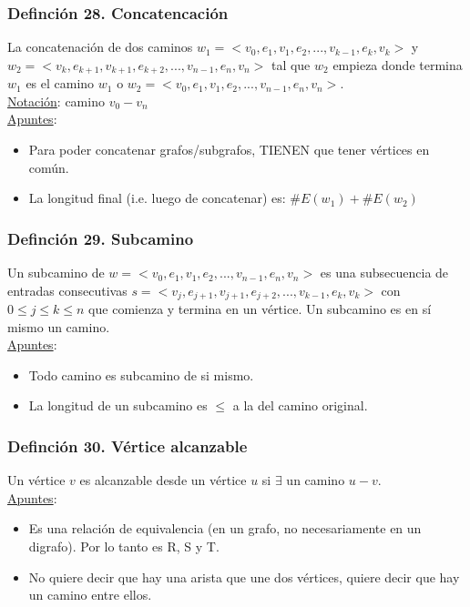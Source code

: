 \documentclass{article}
\begin{document}
\subsubsection*{Definción 28. Concatencación}
La concatenación de dos caminos $w_1 =< v_0,e_1,v_1,e_2,...,v_{k-1},e_k,v_k>$ y $w_2 =< v_k,e_{k+1},v_{k+1},e_{k+2},...,v_{n-1},e_n,v_n>$ tal que $w_2$ empieza donde termina $w_1$ es el camino $w_1$ o $w_2 = < v_0,e_1,v_1,e_2,...,v_{n-1},e_n,v_n>$.
\\\underline{Notación}: camino $v_0 - v_n$
\\\underline{Apuntes}:
\begin{itemize}
    \item Para poder concatenar grafos/subgrafos, TIENEN que tener vértices en común.
    \item La longitud final (i.e. luego de concatenar) es: $\#E(w_1) + \#E(w_2)$
\end{itemize}

\subsubsection*{Definción 29. Subcamino}
Un subcamino de $w =< v_0,e_1,v_1,e_2,...,v_{n-1},e_n,v_n>$ es una subsecuencia de entradas consecutivas $s =< v_j,e_{j+1},v_{j+1},e_{j+2},...,v_{k-1},e_k,v_k>$ con $0 \leq j \leq k \leq n$ que comienza y termina en un vértice.
Un subcamino es en sí mismo un camino.
\\\underline{Apuntes}:
\begin{itemize}
    \item Todo camino es subcamino de si mismo.
    \item La longitud de un subcamino es $\leq$ a la del camino original.
\end{itemize}

\subsubsection*{Definción 30. Vértice alcanzable}
Un vértice $v$ es alcanzable desde un vértice $u$ si $\exists$ un camino $u-v$.
\\\underline{Apuntes}:
\begin{itemize}
    \item Es una relación de equivalencia (en un grafo, no necesariamente en un digrafo). Por lo tanto es R, S y T.
    \item No quiere decir que hay una arista que une dos vértices, quiere decir que hay un camino entre ellos.
\end{itemize}
\end{document}
